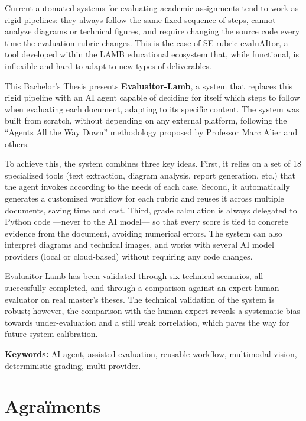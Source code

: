 \documentclass[12pt,a4paper,twoside]{report}
\begin{document}
Current automated systems for evaluating academic assignments tend to work as rigid pipelines: they always follow the same fixed sequence of steps, cannot analyze diagrams or technical figures, and require changing the source code every time the evaluation rubric changes. This is the case of SE-rubric-evaluAItor, a tool developed within the LAMB educational ecosystem that, while functional, is inflexible and hard to adapt to new types of deliverables.

This Bachelor's Thesis presents \textbf{Evaluaitor-Lamb}, a system that replaces this rigid pipeline with an AI agent capable of deciding for itself which steps to follow when evaluating each document, adapting to its specific content. The system was built from scratch, without depending on any external platform, following the ``Agents All the Way Down'' methodology \cite{alier2025} proposed by Professor Marc Alier and others.

To achieve this, the system combines three key ideas. First, it relies on a set of 18 specialized tools (text extraction, diagram analysis, report generation, etc.) that the agent invokes according to the needs of each case. Second, it automatically generates a customized workflow for each rubric and reuses it across multiple documents, saving time and cost. Third, grade calculation is always delegated to Python code ---never to the AI model--- so that every score is tied to concrete evidence from the document, avoiding numerical errors. The system can also interpret diagrams and technical images, and works with several AI model providers (local or cloud-based) without requiring any code changes.

Evaluaitor-Lamb has been validated through six technical scenarios, all successfully completed, and through a comparison against an expert human evaluator on real master's theses. The technical validation of the system is robust; however, the comparison with the human expert reveals a systematic bias towards under-evaluation and a still weak correlation, which paves the way for future system calibration.

\textbf{Keywords:} AI agent, assisted evaluation, reusable workflow, multimodal vision, deterministic grading, multi-provider.

\chapter*{Agra\"iments}
\label{chap:agraiments}
\end{document}
